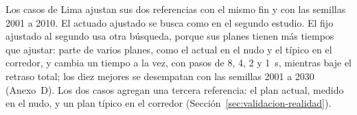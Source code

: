 Los casos de Lima ajustan sus dos referencias con el mismo fin y con
las semillas 2001 a 2010. El actuado ajustado se busca como en el
segundo estudio. El fijo ajustado al segundo usa otra búsqueda, porque
sus planes tienen más tiempos que ajustar: parte de varios planes, como
el actual en el nudo y el típico en el corredor, y cambia un tiempo a
la vez, con pasos de 8, 4, 2 y 1~s, mientras baje el retraso total; los
diez mejores se desempatan con las semillas 2001 a 2030 (Anexo~D). Los
dos casos agregan una tercera referencia: el plan actual, medido en el
nudo, y un plan típico en el corredor
(Sección~\ref{sec:validacion-realidad}).


